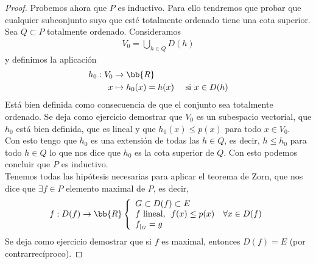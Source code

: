 \begin{teo}
\begin{proof}
        Probemos ahora que $P$ es inductivo. Para ello tendremos que probar que cualquier subconjunto suyo que esté totalmente ordenado tiene una cota superior. Sea $Q\subset P$ totalmente ordenado. Consideramos
        \begin{gather*}
            V_0 = \bigcup_{h\in Q}D(h)
        \end{gather*}
        y definimos la aplicación
        \begin{align*}
            h_0: V_0 &\to \bb{R}\\
            x &\mapsto h_0(x) = h(x) \ \ \ \text{ si } x\in D(h)
        \end{align*}
        Está bien definida como consecuencia de que el conjunto sea totalmente ordenado. Se deja como ejercicio demostrar que $V_0$ es un subespacio vectorial, que $h_0$ está bien definida, que es lineal y que $h_0(x)\leq p(x)$ para todo $x\in V_0$.\\

        Con esto tengo que $h_0$ es una extensión de todas las $h\in Q$, es decir, $h\leq h_0$ para todo $h\in Q$ lo que nos dice que $h_0$ es la cota superior de $Q$. Con esto podemos concluir que $P$ es inductivo.\\
        
        Tenemos todas las hipótesis necesarias para aplicar el teorema de Zorn, que nos dice que $\exists f \in P$ elemento maximal de $P$, es decir, 
        \begin{align*}
            f:D(f) \to \bb{R} \left\{
            \begin{array}{l}
                G\subset D(f)\subset E\\
                f\text{ lineal, }\ f(x)\leq p(x)\ \ \ \forall x \in D(f)\\
                f_{|_G} = g
            \end{array}
            \right.
        \end{align*}
        Se deja como ejercicio demostrar que si $f$ es maximal, entonces $D(f)=E$ (por contrarrecíproco).
    \end{proof}
\end{teo}



